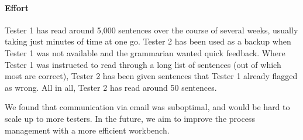 \paragraph{Effort}

Tester 1 has read around 5,000 sentences over the course of several
weeks, usually taking just minutes of time at one go. Tester 2 has
been used as a backup when Tester 1 was not available and the
grammarian wanted quick feedback. Where Tester 1 was instructed to
read through a long list of sentences (out of which most are correct),
Tester 2 has been given sentences that Tester 1 already flagged as
wrong. All in all, Tester 2 has read around 50 sentences.

We found that communication via email was suboptimal, and would be
hard to scale up to more testers.  In the future, we aim to improve
the process management with a more efficient workbench.
